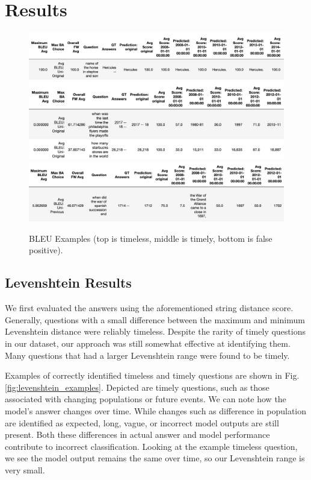 \documentclass{article}
\begin{document}
\section{Results}
\label{results}
\begin{figure}[ht]
	\begin{center}
		\includegraphics[width=5in]{timeless bleu.png}
		\includegraphics[width=5in]{timely bleu.png}
		\includegraphics[width=5in]{bleu false pos.png}
	\end{center}
	\caption{BLEU Examples (top is timeless, middle is timely, bottom is false positive).}
	\label{fig:bleu_examples}
\end{figure}

\subsection{Levenshtein Results}
\label{fuzzy results}

We first evaluated the answers using the aforementioned string distance score.
Generally, questions with a small difference between the maximum and minimum
Levenshtein distance were reliably timeless. Despite the rarity of timely
questions in our dataset, our approach was still somewhat effective at
identifying them. Many questions that had a larger Levenshtein range were found
to be timely.

Examples of correctly identified timeless and timely questions are shown in Fig.
\ref{fig:levenshtein_examples}. Depicted are timely questions, such as those
associated with changing populations or future events. We can note how the
model’s answer changes over time. While changes such as difference in population
are identified as expected, long, vague, or incorrect model outputs are still
present. Both these differences in actual answer and model performance
contribute to incorrect classification. Looking at the example timeless
question, we see the model output remains the same over time, so our Levenshtein
range is very small.
\end{document}

